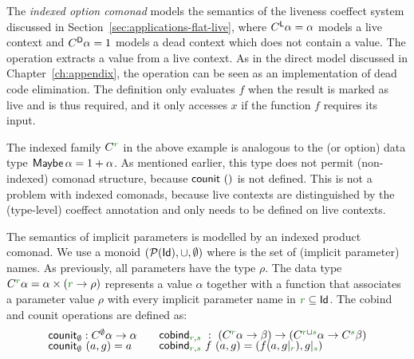 \noindent
The \emph{indexed option comonad} models the semantics of the liveness coeffect system discussed in 
Section~\ref{sec:applications-flat-live}, where $C^{\textnormal{\sffamily L}}\alpha = \alpha$ models a live context 
and $C^{\textnormal{\sffamily D}}\alpha=1$ models a dead context which does not contain a value. The 
operation extracts a value from a live context. As in the direct model discussed in Chapter~\ref{ch:appendix},
the  operation can be seen as an implementation of dead code elimination. The definition 
only evaluates $f$ when the result is marked as live and is thus required, and it only accesses $x$ if 
the function $f$ requires its input.

The indexed family $\ctyp{\cclrd{r}}{}$ in the above example is analogous to the 
(or option) data type $\textnormal{\sffamily Maybe}\,\alpha = 1 + \alpha$. As mentioned earlier, this type does not 
permit (non-indexed) comonad structure, because $\textnormal{\sffamily counit}~()$ is not defined. This is not a 
problem with indexed comonads, because live contexts are distinguished by the (type-level) coeffect 
annotation and  only needs to be defined on live contexts.

\begin{example}
The semantics of implicit parameters is modelled by an indexed product comonad. We use a monoid
$(\mathcal{P}(\textnormal{\sffamily Id}), \cup, \emptyset)$ where  is the set of (implicit parameter) names.
As previously, all parameters have the type $\rho$. The data type $\ctyp{\cclrd{r}}{\alpha}
= \alpha \times (\cclrd{r} \rightarrow \rho)$ represents a value $\alpha$ together with a function that
associates a parameter value $\rho$ with every implicit parameter name in $\cclrd{r} \subseteq \ident{Id}$.
The cobind and counit operations are defined as:
%
\begin{equation*}
\begin{array}{l}
\ident{counit}_{\emptyset} : \ctyp{\emptyset}{\alpha} \rightarrow \alpha \\[-0.25em]
\ident{counit}_{\emptyset}~(a, g) = a\\[0.5em]
\end{array}
\quad
\begin{array}{l}
\ident{cobind}_{\cclrd{r},\cclrd{s}} ~:~ (\ctyp{\cclrd{r}}{\alpha} \rightarrow \beta) 
    \rightarrow (\ctyp{\cclrd{r}\cup\cclrd{s}}{\alpha} \rightarrow \ctyp{\cclrd{s}}{\beta})\\[-0.25em]
\ident{cobind}_{\cclrd{r},\cclrd{s}}~f~(a,g) = (f(a,\restr{g}{\cclrd{r}}), \restr{g}{\cclrd{s}})\\[0.5em]
\end{array}
\end{equation*}
\end{example}

